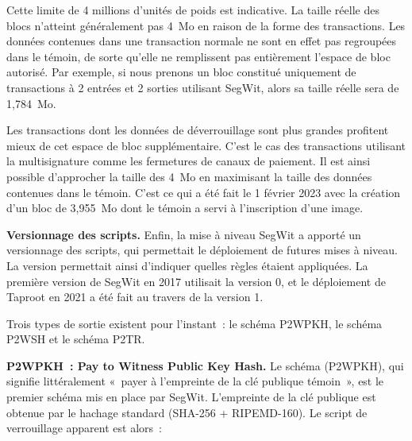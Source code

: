 Cette limite de 4 millions d'unités de poids est indicative. La taille réelle des blocs n'atteint généralement pas 4~Mo en raison de la forme des transactions. Les données contenues dans une transaction normale ne sont en effet pas regroupées dans le témoin, de sorte qu'elle ne remplissent pas entièrement l'espace de bloc autorisé. Par exemple, si nous prenons un bloc constitué uniquement de transactions à 2 entrées et 2 sorties utilisant SegWit, alors sa taille réelle sera de 1,784~Mo.

Les transactions dont les données de déverrouillage sont plus grandes profitent mieux de cet espace de bloc supplémentaire. C'est le cas des transactions utilisant la multisignature comme les fermetures de canaux de paiement. Il est ainsi possible d'approcher la taille des 4~Mo en maximisant la taille des données contenues dans le témoin. C'est ce qui a été fait le 1\ier{} février 2023 avec la création d'un bloc de 3,955~Mo dont le témoin a servi à l'inscription d'une image.


\textbf{Versionnage des scripts.} Enfin, la mise à niveau SegWit a apporté un versionnage des scripts, qui permettait le déploiement de futures mises à niveau. La version permettait ainsi d'indiquer quelles règles étaient appliquées. La première version de SegWit en 2017 utilisait la version 0, et le déploiement de Taproot en 2021 a été fait au travers de la version 1.


Trois types de sortie existent pour l'instant~: le schéma P2WPKH, le schéma P2WSH et le schéma P2TR.

\textbf{P2WPKH~: Pay to Witness Public Key Hash.} Le schéma  (P2WPKH), qui signifie littéralement «~payer à l'empreinte de la clé publique témoin~», est le premier schéma mis en place par SegWit. L'empreinte de la clé publique est obtenue par le hachage standard (SHA-256 + RIPEMD-160). Le script de verrouillage apparent est alors~:

